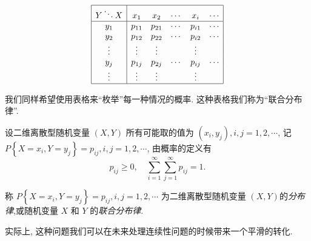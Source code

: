     $$
        \begin{array}{|c|ccccc|}
            \hline Y \ddots X & x_1     & x_2     & \cdots & x_i     & \cdots \\
            \hline y_1 & p_{11}  & p_{21}  & \cdots & p_{i 1} & \cdots \\
            y_2        & p_{12}  & p_{22}  & \cdots & p_{i 2} & \cdots \\
            \vdots     & \vdots  & \vdots  &        & \vdots  &        \\
            y_j        & p_{1 j} & p_{2 j} & \cdots & p_{i j} & \cdots \\
            \vdots     & \vdots  & \vdots  &        & \vdots  &        \\
            \hline
        \end{array}
    $$
    
    我们同样希望使用表格来``枚举''每一种情况的概率. 这种表格我们称为``联合分布律''. 

    \begin{definition}
      设二维离散型随机变量 $(X, Y)$ 所有可能取的值为 $\left(x_i, y_j\right), i, j=1,2, \cdots$, 记 $P\left\{X=x_i, Y=y_j\right\}=p_{i j}, i, j=1,2, \cdots$, 由概率的定义有
    $$
        p_{i j} \geqslant 0, \quad \sum_{i=1}^{\infty} \sum_{j=1}^{\infty} p_{i j}=1 .
    $$

    称 $P\left\{X=x_i, Y=y_j\right\}=p_{i j}, i, j=1,2, \cdots$ 为二维离散型随机变量 $(X, Y)$的\emph{分布律},或随机变量 $X$ 和 $Y$ 的\emph{联合分布律}.
    \end{definition}

    实际上, 这种问题我们可以在未来处理连续性问题的时候带来一个平滑的转化. 

